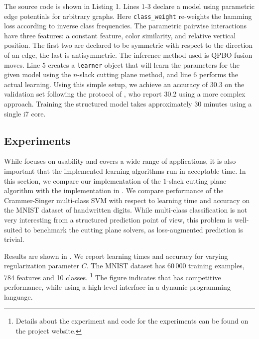 The source code is shown in Listing 1.
Lines 1-3 declare a model using parametric edge potentials for arbitrary graphs.
Here \texttt{class\_weight} re-weights the hamming loss according to inverse class
frequencies. The parametric pairwise interactions have three features: a
constant feature, color similarity, and relative vertical position. The first two
are declared to be symmetric with respect to the direction of an edge, the last
is antisymmetric. The inference method used is QPBO-fusion moves.  Line 5
creates a \texttt{learner} object that will learn the parameters for the given
model using the $n$-slack cutting plane method, and line 6 performs the actual
learning.  Using this simple setup, we achieve an accuracy of 30.3 on the
validation set following the protocol of \citet{krahenbuhl2012efficient}, who
report 30.2 using a more complex approach. Training the structured model takes
approximately 30 minutes using a single i7 core.

\subsection{Experiments}\label{sec:benchmarks}
While \pystruct focuses on usability and covers a wide range of applications, it is also
important that the implemented learning algorithms run in acceptable time.
In this section, we compare our implementation of the $1$-slack cutting plane
algorithm with the implementation in \svmstruct.
We compare performance of the Crammer-Singer multi-class SVM with respect to
learning time and accuracy on the MNIST dataset of handwritten digits.
While multi-class classification is not very interesting from a structured
prediction point of view, this problem is well-suited to benchmark the cutting
plane solvers, as loss-augmented prediction is trivial.

Results are shown in . We report learning times and accuracy for
varying regularization parameter $C$. The MNIST dataset has 60\,000 training
examples, 784 features and 10 classes.%
\footnote{Details about the experiment and code for the experiments can be found on the project website.}
The figure indicates that \pystruct has competitive performance, while using
a high-level interface in a dynamic programming language.

